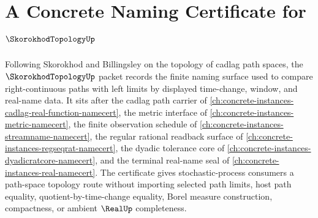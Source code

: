 \chapter{A Concrete Naming Certificate for $\SkorokhodTopologyUp$}
\label{ch:concrete-instances-skorokhod-topology-namecert}

Following Skorokhod and Billingsley on the topology of cadlag path spaces, the $\SkorokhodTopologyUp$ packet records the finite naming surface used to compare right-continuous paths with left limits by displayed time-change, window, and real-name data. It sits after the cadlag path carrier of \autoref{ch:concrete-instances-cadlag-real-function-namecert}, the metric interface of \autoref{ch:concrete-instances-metric-namecert}, the finite observation schedule of \autoref{ch:concrete-instances-streamname-namecert}, the regular rational readback surface of \autoref{ch:concrete-instances-regseqrat-namecert}, the dyadic tolerance core of \autoref{ch:concrete-instances-dyadicratcore-namecert}, and the terminal real-name seal of \autoref{ch:concrete-instances-real-namecert}. The certificate gives stochastic-process consumers a path-space topology route without importing selected path limits, host path equality, quotient-by-time-change equality, Borel measure construction, compactness, or ambient $\RealUp$ completeness.


